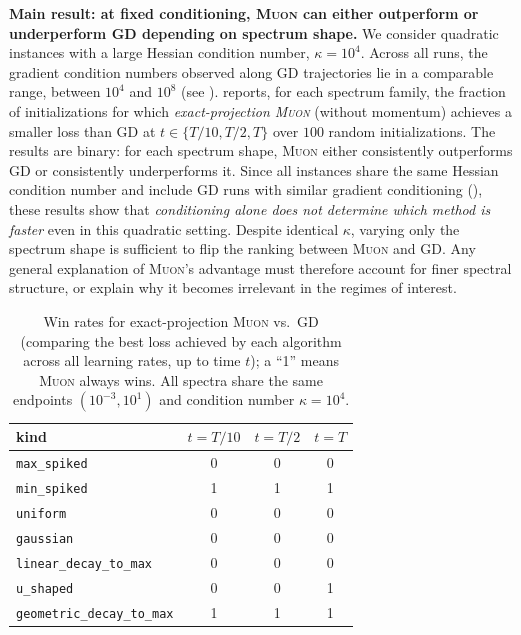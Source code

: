 \documentclass{article}
\theoremstyle{plain}
\theoremstyle{definition}
\theoremstyle{remark}
\newcommand{\GD}{\textsc{GD}}
\newcommand{\Muon}{\textsc{Muon}}
\begin{document}
\textbf{Main result: at fixed conditioning, 
\Muon{} can either outperform or underperform \GD{} depending on spectrum shape.}
We consider quadratic instances with a large Hessian condition number, $\kappa=10^4$.
Across all runs, the gradient condition numbers observed along \GD{} trajectories
lie in a comparable range, between $10^4$ and $10^8$
(see ).
 reports, for each spectrum family, the fraction of
initializations for which \emph{exact-projection \Muon{}} (without momentum)
achieves a smaller loss than \GD{} at 
$t\in\{T/10,T/2,T\}$ over $100$ random initializations.
The results are binary: for each spectrum shape, \Muon{} either
consistently outperforms \GD{} or consistently underperforms it.
Since all instances share the same Hessian condition number and include
\GD{} runs with similar gradient conditioning (), 
these results show that
\emph{conditioning alone does not determine which method is faster}
even in this quadratic setting. 
Despite identical $\kappa$, varying only the spectrum shape is sufficient to flip the ranking between \Muon{} and \GD{}.
Any general explanation of \Muon{}'s advantage must therefore account for finer spectral structure,
or explain why it becomes irrelevant in the regimes of interest.

\begin{table}[t]
\centering
\small
\setlength{\tabcolsep}{3pt}
\renewcommand{\arraystretch}{1.15}
\caption{Win rates for exact-projection \Muon{} vs.\ \GD{} (comparing the best loss achieved by each algorithm across all learning rates, up to time $t$); a ``1'' means \Muon{} always wins. All spectra share the same endpoints $(10^{-3}, 10^1)$ and condition number $\kappa=10^4$.}
\label{tab:exact-muon-vs-gd-win}
\begin{tabular}{lccc}
\toprule
kind & $t=T/10$ & $t=T/2$ & $t=T$ \\
\midrule
\texttt{max\_spiked} & 0 & 0 & 0 \\
\texttt{min\_spiked} & 1 & 1 & 1 \\
\texttt{uniform} & 0 & 0 & 0 \\
\texttt{gaussian} & 0 & 0 & 0 \\
\texttt{linear\_decay\_to\_max} & 0 & 0 & 0 \\
\texttt{u\_shaped} & 0 & 0 & 1 \\
\texttt{geometric\_decay\_to\_max} & 1 & 1 & 1 \\
\bottomrule
\end{tabular}
\end{table}
\end{document}
